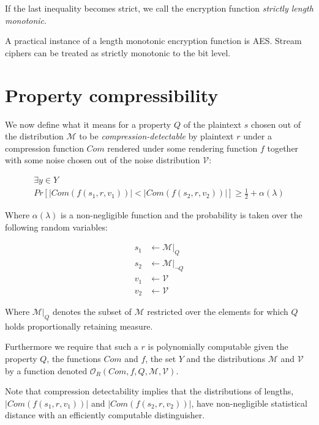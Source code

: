 \documentclass{article}
\begin{document}
If the last inequality becomes strict, we call the encryption function
\textit{strictly length monotonic}.

A practical instance of a length monotonic encryption function is AES.
Stream ciphers can be treated as strictly monotonic to the bit level.

\section{Property compressibility}

We now define what it means for a property $Q$ of the plaintext $s$ chosen out
of the distribution $\mathcal{M}$ to be \textit{compression-detectable} by
plaintext $r$ under a compression function $Com$ rendered under some rendering
function $f$ together with some noise chosen out of the noise distribution
$\mathcal{V}$:

\begin{equation*}
    \begin{split}
        \exists y \in Y\\
        Pr[
            |Com(f(s_1, r, v_1))| < |Com(f(s_2, r, v_2))|
        ]
        \geq
        \frac{1}{2} + \alpha(\lambda)
    \end{split}
\end{equation*}

Where $\alpha(\lambda)$ is a non-negligible function and
the probability is taken over the following random variables:

\begin{align*}
    s_1 &\leftarrow \mathcal{M}|_Q\\
    s_2 &\leftarrow \mathcal{M}|_{\lnot Q}\\
    v_1 &\leftarrow \mathcal{V}\\
    v_2 &\leftarrow \mathcal{V}
\end{align*}

Where $\mathcal{M}|_Q$ denotes the subset of $\mathcal{M}$ restricted over the
elements for which $Q$ holds proportionally retaining measure.

Furthermore we require that such a $r$ is polynomially computable given the
property $Q$, the functions $Com$ and $f$, the set $Y$ and the distributions
$\mathcal{M}$ and $\mathcal{V}$ by a function denoted $\mathcal{O}_R(Com, f, Q,
\mathcal{M}, \mathcal{V})$.

Note that compression detectability implies that the distributions of lengths,
$|Com(f(s_1, r, v_1))|$ and $|Com(f(s_2, r, v_2))|$, have non-negligible statistical
distance with an efficiently computable distinguisher.
\end{document}
